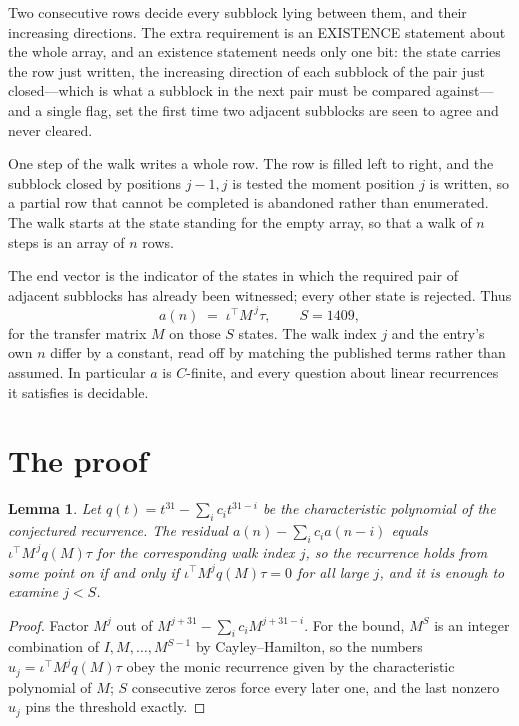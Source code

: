 \documentclass[11pt,a4paper]{article}
\theoremstyle{plain}
\newtheorem{lemma}[theorem]{Lemma}
\theoremstyle{definition}
\begin{document}
Two consecutive rows decide every subblock lying between them, and their increasing directions. The extra requirement is an EXISTENCE statement about the whole array, and an existence statement needs only one bit: the state carries the row just written, the increasing direction of each subblock of the pair just closed---which is what a subblock in the next pair must be compared against---and a single flag, set the first time two adjacent subblocks are seen to agree and never cleared.

One step of the walk writes a whole row. The row is filled left to right, and the subblock
closed by positions $j-1,j$ is tested the moment position $j$ is written, so a partial row that
cannot be completed is abandoned rather than enumerated. The walk starts at the state standing
for the empty array, so that a walk of $n$ steps is an array of $n$ rows.

The end vector is the indicator of the states in which the required pair of adjacent subblocks has already been witnessed; every other state is rejected. Thus
\[
a(n)\;=\;\iota^{\!\top}M^{\,j}\tau ,\qquad S=1409,
\]
for the transfer matrix $M$ on those $S$ states. The walk index $j$ and the entry's own $n$
differ by a constant, read off by matching the published terms rather than assumed. In
particular $a$ is $C$-finite, and every question about linear recurrences it satisfies is
decidable.

\section{The proof}

\begin{lemma}\label{lem:crit}
Let $q(t)=t^{31}-\sum_i c_it^{31-i}$ be the characteristic polynomial of the
conjectured recurrence. The residual $a(n)-\sum_ic_ia(n-i)$ equals
$\iota^{\!\top}M^{\,j}q(M)\tau$ for the corresponding walk index $j$, so the recurrence
holds from some point on if and only if $\iota^{\!\top}M^{j}q(M)\tau=0$ for all large $j$,
and it is enough to examine $j<S$.
\end{lemma}

\begin{proof}
Factor $M^{j}$ out of $M^{j+31}-\sum_ic_iM^{j+31-i}$. For the bound, $M^{S}$
is an integer combination of $I,M,\dots,M^{S-1}$ by Cayley--Hamilton, so the numbers
$u_j=\iota^{\!\top}M^{j}q(M)\tau$ obey the monic recurrence given by the characteristic
polynomial of $M$; $S$ consecutive zeros force every later one, and the last nonzero $u_j$
pins the threshold exactly.
\end{proof}
\end{document}
